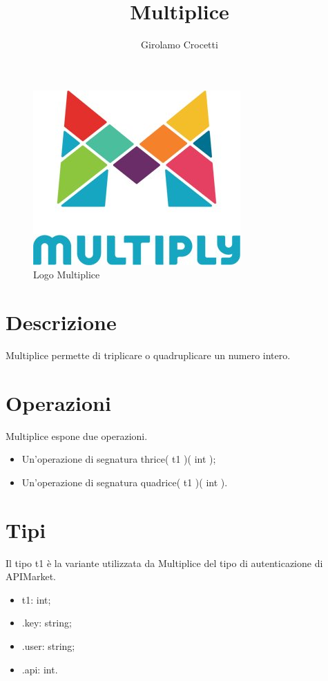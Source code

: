 \documentclass[a4paper]{article}
\title{Multiplice}
\author{Girolamo Crocetti}
\begin{document}
\maketitle

\begin{figure}[H]
	\centering
	\includegraphics[width=0.3\linewidth]{Multiplice.jpg}
	\caption{Logo Multiplice}
\end{figure}

\section{Descrizione}

Multiplice permette di triplicare o quadruplicare un numero intero.

\section{Operazioni}

Multiplice espone due operazioni.
\begin{itemize}
	\item Un'operazione di segnatura thrice( t1 )( int );
	\item Un'operazione di segnatura quadrice( t1 )( int ).
\end{itemize}

\section{Tipi}

Il tipo t1 è la variante utilizzata da Multiplice del tipo di autenticazione di APIMarket.
\begin{itemize}
	\item t1: int;
	\item .key: string;
	\item .user: string;
	\item .api: int.
\end{itemize}
\end{document}
